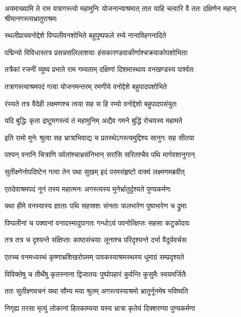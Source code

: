 \threelineshloka
{अयमाख्यामि ते राम यत्रागस्त्यो महामुनिः}
{योजनान्याश्रमात् तात याहि चत्वारि वै ततः}
{दक्षिणेन महान् श्रीमानगस्त्यभ्रातुराश्रमः} %

\twolineshloka
{स्थलीप्रायवनोद्देशे पिप्पलीवनशोभिते}
{बहुपुष्पफले रम्ये नानाविहगनादिते} %

\twolineshloka
{पद्मिन्यो विविधास्तत्र प्रसन्नसलिलाशयाः}
{हंसकारण्डवाकीर्णाश्चक्रवाकोपशोभिताः} %

\twolineshloka
{तत्रैकां रजनीं व्युष्य प्रभाते राम गम्यताम्}
{दक्षिणां दिशमास्थाय वनखण्डस्य पार्श्वतः} %

\twolineshloka
{तत्रागस्त्याश्रमपदं गत्वा योजनमन्तरम्}
{रमणीये वनोद्देशे बहुपादपशोभिते} %

\twolineshloka
{रंस्यते तत्र वैदेही लक्ष्मणश्च त्वया सह}
{स हि रम्यो वनोद्देशो बहुपादपसंयुतः} %

\twolineshloka
{यदि बुद्धिः कृता द्रष्टुमगस्त्यं तं महामुनिम्}
{अद्यैव गमने बुद्धिं रोचयस्व महामते} %

\twolineshloka
{इति रामो मुनेः श्रुत्वा सह भ्रात्राभिवाद्य च}
{प्रतस्थेऽगस्त्यमुद्दिश्य सानुगः सह सीतया} %

\twolineshloka
{पश्यन् वनानि चित्राणि पर्वतांश्चाभ्रसंनिभान्}
{सरांसि सरितश्चैव पथि मार्गवशानुगान्} %

\twolineshloka
{सुतीक्ष्णेनोपदिष्टेन गत्वा तेन पथा सुखम्}
{इदं परमसंहृष्टो वाक्यं लक्ष्मणमब्रवीत्} %

\twolineshloka
{एतदेवाश्रमपदं नूनं तस्य महात्मनः}
{अगस्त्यस्य मुनेर्भ्रातुर्दृश्यते पुण्यकर्मणः} %

\twolineshloka
{यथा हीमे वनस्यास्य ज्ञाताः पथि सहस्रशः}
{संनताः फलभारेण पुष्पभारेण च द्रुमाः} %

\twolineshloka
{पिप्पलीनां च पक्वानां वनादस्मादुपागतः}
{गन्धोऽयं पवनोत्क्षिप्तः सहसा कटुकोदयः} %

\twolineshloka
{तत्र तत्र च दृश्यन्ते संक्षिप्ताः काष्ठसंचयाः}
{लूनाश्च परिदृश्यन्ते दर्भा वैदूर्यवर्चसः} %

\twolineshloka
{एतच्च वनमध्यस्थं कृष्णाभ्रशिखरोपमम्}
{पावकस्याश्रमस्थस्य धूमाग्रं सम्प्रदृश्यते} %

\twolineshloka
{विविक्तेषु च तीर्थेषु कृतस्नाना द्विजातयः}
{पुष्पोपहारं कुर्वन्ति कुसुमैः स्वयमर्जितैः} %

\twolineshloka
{ततः सुतीक्ष्णवचनं यथा सौम्य मया श्रुतम्}
{अगस्त्यस्याश्रमो भ्रातुर्नूनमेष भविष्यति} %

\twolineshloka
{निगृह्य तरसा मृत्युं लोकानां हितकाम्यया}
{यस्य भ्रात्रा कृतेयं दिक्शरण्या पुण्यकर्मणा} %

